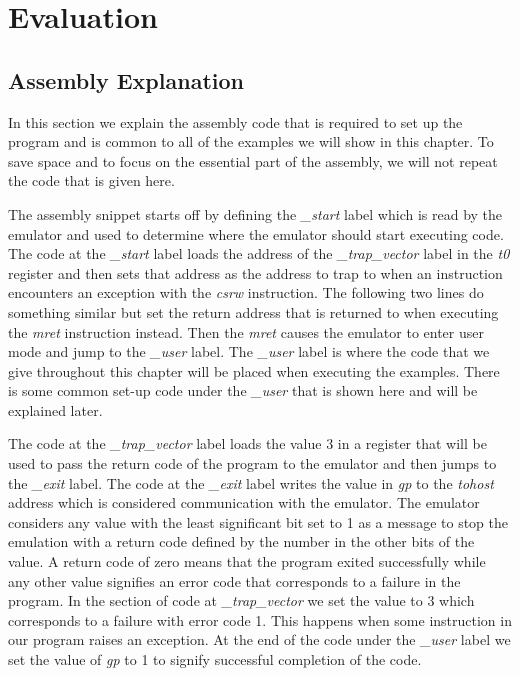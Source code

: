 \chapter{Evaluation}

\section{Assembly Explanation}
In this section we explain the assembly code that is required to set up the program and is common to all of the examples we will show in this chapter.
To save space and to focus on the essential part of the assembly, we will not repeat the code that is given here.

The assembly snippet starts off by defining the \textit{\_start} label which is read by the emulator and used to determine where the emulator should start executing code.
The code at the \textit{\_start} label loads the address of the \textit{\_trap\_vector} label in the \textit{t0} register and then sets that address as the address to trap to when an instruction encounters an exception with the \textit{csrw} instruction.
The following two lines do something similar but set the return address that is returned to when executing the \textit{mret} instruction instead.
Then the \textit{mret} causes the emulator to enter user mode and jump to the \textit{\_user} label.
The \textit{\_user} label is where the code that we give throughout this chapter will be placed when executing the examples.
There is some common set-up code under the \textit{\_user} that is shown here and will be explained later.

The code at the \textit{\_trap\_vector} label loads the value 3 in a register that will be used to pass the return code of the program to the emulator and then jumps to the \textit{\_exit} label.
The code at the \textit{\_exit} label writes the value in \textit{gp} to the \textit{tohost} address which is considered communication with the emulator.
The emulator considers any value with the least significant bit set to 1 as a message to stop the emulation with a return code defined by the number in the other bits of the value.
A return code of zero means that the program exited successfully while any other value signifies an error code that corresponds to a failure in the program.
In the section of code at \textit{\_trap\_vector} we set the value to 3 which corresponds to a failure with error code 1.
This happens when some instruction in our program raises an exception.
At the end of the code under the \textit{\_user} label we set the value of \textit{gp} to 1 to signify successful completion of the code.

